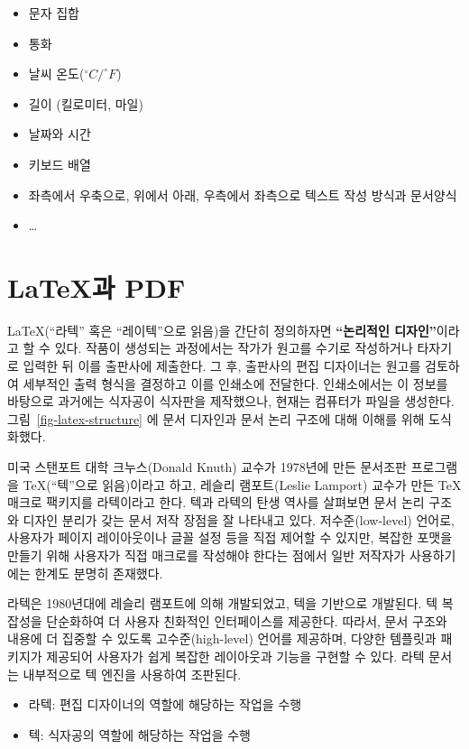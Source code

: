 \documentclass[
  letterpaper,
]{book}
\providecommand{\tightlist}{%
  \setlength{\itemsep}{0pt}\setlength{\parskip}{0pt}}\usepackage{longtable,booktabs,array}
\begin{document}
\begin{itemize}
\tightlist
\item
  문자 집합
\item
  통화
\item
  날씨 온도(\(^{\circ} C / ^{\circ} F\))
\item
  길이 (킬로미터, 마일)
\item
  날짜와 시간
\item
  키보드 배열
\item
  좌측에서 우축으로, 위에서 아래, 우측에서 좌측으로 텍스트 작성 방식과
  문서양식
\item
  \ldots{}
\end{itemize}

\hypertarget{uxacfc-pdf}{%
\chapter{\texorpdfstring{\LaTeX 과 PDF}{과 PDF}}\label{uxacfc-pdf}}

LaTeX(``라텍'' 혹은 ``레이텍''으로 읽음)을 간단히 정의하자면
\textbf{``논리적인 디자인''}이라고 할 수 있다. 작품이 생성되는
과정에서는 작가가 원고를 수기로 작성하거나 타자기로 입력한 뒤 이를
출판사에 제출한다. 그 후, 출판사의 편집 디자이너는 원고를 검토하여
세부적인 출력 형식을 결정하고 이를 인쇄소에 전달한다. 인쇄소에서는 이
정보를 바탕으로 과거에는 식자공이 식자판을 제작했으나, 현재는 컴퓨터가
파일을 생성한다. 그림~\ref{fig-latex-structure} 에 문서 디자인과 문서
논리 구조에 대해 이해를 위해 도식화했다.

미국 스탠포트 대학 크누스(Donald Knuth) 교수가 1978년에 만든 문서조판
프로그램을 TeX(``텍''으로 읽음)이라고 하고, 레슬리 램포트(Leslie
Lamport) 교수가 만든 TeX 매크로 팩키지를 라텍이라고 한다. 텍과 라텍의
탄생 역사를 살펴보면 문서 논리 구조와 디자인 분리가 갖는 문서 저작
장점을 잘 나타내고 있다. 저수준(low-level) 언어로, 사용자가 페이지
레이아웃이나 글꼴 설정 등을 직접 제어할 수 있지만, 복잡한 포맷을 만들기
위해 사용자가 직접 매크로를 작성해야 한다는 점에서 일반 저작자가
사용하기에는 한계도 분명히 존재했다.

라텍은 1980년대에 레슬리 램포트에 의해 개발되었고, 텍을 기반으로
개발된다. 텍 복잡성을 단순화하여 더 사용자 친화적인 인터페이스를
제공한다. 따라서, 문서 구조와 내용에 더 집중할 수 있도록
고수준(high-level) 언어를 제공하며, 다양한 템플릿과 패키지가 제공되어
사용자가 쉽게 복잡한 레이아웃과 기능을 구현할 수 있다. 라텍 문서는
내부적으로 텍 엔진을 사용하여 조판된다. \autocite{Kim2017}

\begin{itemize}
\tightlist
\item
  라텍: 편집 디자이너의 역할에 해당하는 작업을 수행
\item
  텍: 식자공의 역할에 해당하는 작업을 수행
\end{itemize}
\end{document}
